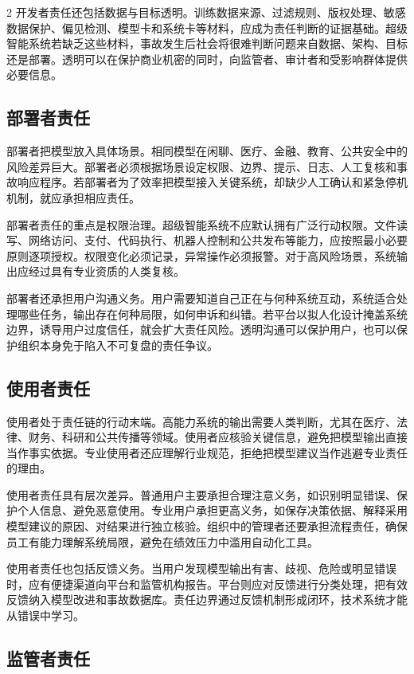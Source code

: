 \documentclass[a4paper,UTF8,zihao=5,twoside]{ctexart}
\begin{document}
\begin{multicols}{2}
开发者责任还包括数据与目标透明。训练数据来源、过滤规则、版权处理、敏感数据保护、偏见检测、模型卡和系统卡等材料，应成为责任判断的证据基础。超级智能系统若缺乏这些材料，事故发生后社会将很难判断问题来自数据、架构、目标还是部署。透明可以在保护商业机密的同时，向监管者、审计者和受影响群体提供必要信息。

\subsection{部署者责任}

部署者把模型放入具体场景。相同模型在闲聊、医疗、金融、教育、公共安全中的风险差异巨大。部署者必须根据场景设定权限、边界、提示、日志、人工复核和事故响应程序。若部署者为了效率把模型接入关键系统，却缺少人工确认和紧急停机机制，就应承担相应责任。

部署者责任的重点是权限治理。超级智能系统不应默认拥有广泛行动权限。文件读写、网络访问、支付、代码执行、机器人控制和公共发布等能力，应按照最小必要原则逐项授权。权限变化必须记录，异常操作必须报警。对于高风险场景，系统输出应经过具有专业资质的人类复核。

部署者还承担用户沟通义务。用户需要知道自己正在与何种系统互动，系统适合处理哪些任务，输出存在何种局限，如何申诉和纠错。若平台以拟人化设计掩盖系统边界，诱导用户过度信任，就会扩大责任风险。透明沟通可以保护用户，也可以保护组织本身免于陷入不可复盘的责任争议。

\subsection{使用者责任}

使用者处于责任链的行动末端。高能力系统的输出需要人类判断，尤其在医疗、法律、财务、科研和公共传播等领域。使用者应核验关键信息，避免把模型输出直接当作事实依据。专业使用者还应理解行业规范，拒绝把模型建议当作逃避专业责任的理由。

使用者责任具有层次差异。普通用户主要承担合理注意义务，如识别明显错误、保护个人信息、避免恶意使用。专业用户承担更高义务，如保存决策依据、解释采用模型建议的原因、对结果进行独立核验。组织中的管理者还要承担流程责任，确保员工有能力理解系统局限，避免在绩效压力中滥用自动化工具。

使用者责任也包括反馈义务。当用户发现模型输出有害、歧视、危险或明显错误时，应有便捷渠道向平台和监管机构报告。平台则应对反馈进行分类处理，把有效反馈纳入模型改进和事故数据库。责任边界通过反馈机制形成闭环，技术系统才能从错误中学习。

\subsection{监管者责任}


\end{multicols}
\end{document}
